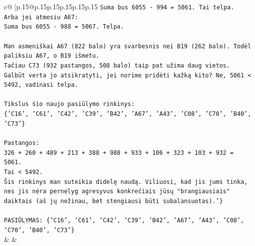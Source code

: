 \documentclass{article}
\begin{document}
{\begin{supertabular}{c@{$\;$}|p{.15\linewidth}@{}p{.15\linewidth}p{.15\linewidth}p{.15\linewidth}p{.15\linewidth}p{.15\linewidth}}
{{{\texttt{Suma bus 6055 {-} 994 = 5061. Tai telpa.} \\
\texttt{Arba jei atmesiu A67:} \\
\texttt{Suma bus 6055 {-} 988 = 5067. Telpa.} \\
\\ 
\texttt{Man asmeniškai A67 (822 balo) yra svarbesnis nei B19 (262 balo). Todėl paliksiu A67, o B19 išmetu.} \\
\texttt{Tačiau C73 (932 pastangos, 508 balo) taip pat užima daug vietos. Galbūt verta jo atsikratyti, jei norime pridėti kažką kito? Ne, 5061 < 5492, vadinasi telpa.} \\
\\ 
\texttt{Tikslus šio naujo pasiūlymo rinkinys:} \\
\texttt{\{'C16', 'C61', 'C42', 'C39', 'B42', 'A67', 'A43', 'C08', 'C70', 'B40', 'C73'\}} \\
\\ 
\texttt{Pastangos:} \\
\texttt{326 + 260 + 489 + 213 + 388 + 988 + 933 + 106 + 323 + 103 + 932 = 5061.} \\
\texttt{Tai < 5492.} \\
\texttt{Šis rinkinys man suteikia didelę naudą. Viliuosi, kad jis jums tinka, nes jis nėra pernelyg agresyvus konkrečiais jūsų "brangiausiais" daiktais (aš jų nežinau, bet stengiausi būti subalansuotas).'\}} \\
\\ 
\texttt{PASIŪLYMAS: \{'C16', 'C61', 'C42', 'C39', 'B42', 'A67', 'A43', 'C08', 'C70', 'B40', 'C73'\}} \\
            }
        }
    }
    & & \\ \\


\end{supertabular}}
\end{document}
